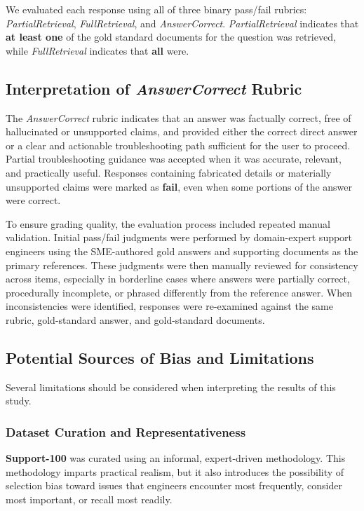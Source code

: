 \documentclass[11pt]{article}
\begin{document}
We evaluated each response using all of three binary pass/fail rubrics:
\textit{PartialRetrieval}, \textit{FullRetrieval}, and \textit{AnswerCorrect}.
\textit{PartialRetrieval} indicates that \textbf{at least one} of the gold standard
documents for the question was retrieved, while \textit{FullRetrieval} indicates
that \textbf{all} were.

\subsection{Interpretation of \textit{AnswerCorrect} Rubric}

The \textit{AnswerCorrect} rubric indicates that an answer was factually
correct, free of hallucinated or unsupported claims, and provided either
the correct direct answer or a clear and actionable troubleshooting path
sufficient for the user to proceed. Partial troubleshooting guidance was
accepted when it was accurate, relevant, and practically useful. Responses
containing fabricated details or materially unsupported claims were
marked as \textbf{fail}, even when some portions of the answer were
correct.

To ensure grading quality, the evaluation process included repeated
manual validation. Initial pass/fail judgments were performed by
domain-expert support engineers using the SME-authored gold answers and
supporting documents as the primary references. These judgments were
then manually reviewed for consistency across items, especially in
borderline cases where answers were partially correct, procedurally
incomplete, or phrased differently from the reference answer. When
inconsistencies were identified, responses were re-examined against the
same rubric, gold-standard answer, and gold-standard documents.


\subsection{Potential Sources of Bias and Limitations}

Several limitations should be considered when interpreting the results
of this study.

\subsubsection{Dataset Curation and Representativeness}

\textbf{Support-100} was curated using an informal, expert-driven methodology.
This methodology imparts
practical realism, but it also introduces the possibility of selection
bias toward issues that engineers encounter most frequently, consider
most important, or recall most readily.
\end{document}

